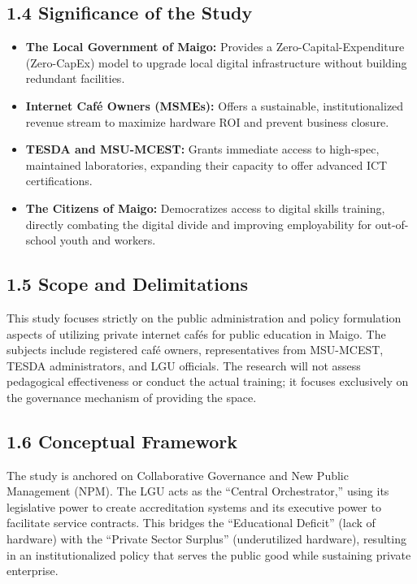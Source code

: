 \subsection*{1.4 Significance of the Study}
\begin{itemize}
    \item \textbf{The Local Government of Maigo:} Provides a Zero-Capital-Expenditure (Zero-CapEx) model to upgrade local digital infrastructure without building redundant facilities.
    \item \textbf{Internet Café Owners (MSMEs):} Offers a sustainable, institutionalized revenue stream to maximize hardware ROI and prevent business closure.
    \item \textbf{TESDA and MSU-MCEST:} Grants immediate access to high-spec, maintained laboratories, expanding their capacity to offer advanced ICT certifications.
    \item \textbf{The Citizens of Maigo:} Democratizes access to digital skills training, directly combating the digital divide and improving employability for out-of-school youth and workers.
\end{itemize}

\subsection*{1.5 Scope and Delimitations}
This study focuses strictly on the public administration and policy formulation aspects of utilizing private internet cafés for public education in Maigo. The subjects include registered café owners, representatives from MSU-MCEST, TESDA administrators, and LGU officials. The research will not assess pedagogical effectiveness or conduct the actual training; it focuses exclusively on the governance mechanism of providing the space.

\subsection*{1.6 Conceptual Framework}
The study is anchored on Collaborative Governance and New Public Management (NPM). The LGU acts as the ``Central Orchestrator,'' using its legislative power to create accreditation systems and its executive power to facilitate service contracts. This bridges the ``Educational Deficit'' (lack of hardware) with the ``Private Sector Surplus'' (underutilized hardware), resulting in an institutionalized policy that serves the public good while sustaining private enterprise.